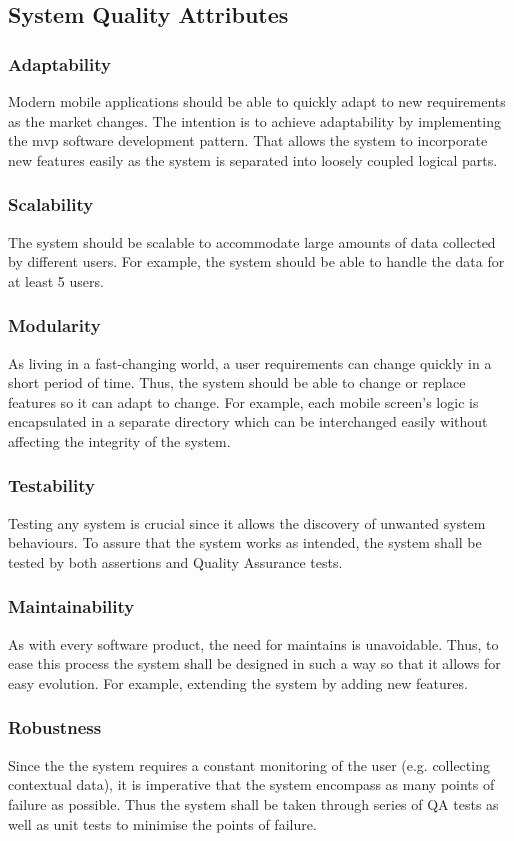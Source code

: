     \subsection{System Quality Attributes}
    \label{section:system-quality-attributes}
        \subsubsection{Adaptability}
        Modern mobile applications should be able to quickly adapt to new requirements as the market changes. The intention is to achieve adaptability by implementing the \gls{mvp} software development pattern. That allows the system to incorporate new features easily as the system is separated into loosely coupled logical parts.
        
        \subsubsection{Scalability}
        The system should be scalable to accommodate large amounts of data collected by different users. For example, the system should be able to handle the data for at least 5 users.
        
        \subsubsection{Modularity}
        As living in a fast-changing world, a user requirements can change quickly in a short period of time. Thus, the system should be able to change or replace features so it can adapt to change. For example, each mobile screen's logic is encapsulated in a separate directory which can be interchanged easily without affecting the integrity of the system.  
        
        \subsubsection{Testability}
        Testing any system is crucial since it allows the discovery of unwanted system behaviours. To assure that the system works as intended, the system shall be tested by both assertions and Quality Assurance tests. 
        
        \subsubsection{Maintainability}
        As with every software product, the need for maintains is unavoidable. Thus, to ease this process the system shall be designed in such a way so that it allows for easy evolution. For example, extending the system by adding new features.
        
        \subsubsection{Robustness}
        Since the the system requires a constant monitoring of the user (e.g. collecting contextual data), it is imperative that the system encompass as many points of failure as possible. Thus the system shall be taken through series of QA tests as well as unit tests to minimise the points of failure. 
    
    
    